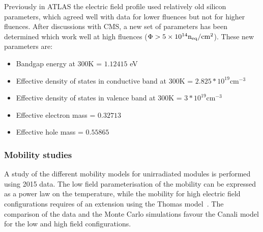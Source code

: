Previously in ATLAS the electric field profile used relatively old silicon parameters, which agreed well with data for lower fluences but not for higher fluences. After discussions with CMS, a new set of parameters has been determined which work well  at high fluences ($\Phi>5\times10^{14} {\rm n_{eq}/cm^2}$). These new parameters are:

\begin{itemize}
\item{Bandgap energy at 300K = $1.12415$ eV}
\item{Effective density of states in conductive band at 300K = $2.825*10^{19} $cm$^{-3}$}
\item{Effective density of states in valence band at 300K = $3*10^{19} $cm$^{-3}$}
\item{Effective electron mass = $0.32713$}
\item{Effective hole mass = $0.55865$}
\end{itemize}


\subsubsection{Mobility studies}
A study of the different mobility models for unirradiated modules is performed using 2015 data. The low field parameterisation of the mobility can be expressed as a power law on the temperature, while the mobility for high electric field configurations requires of an extension using the Thomas model~\cite{bib:thomas}. The comparison of the data and the Monte Carlo simulations favour the Canali model for the low and high field configurations.\\
\label{sec:muModels}


